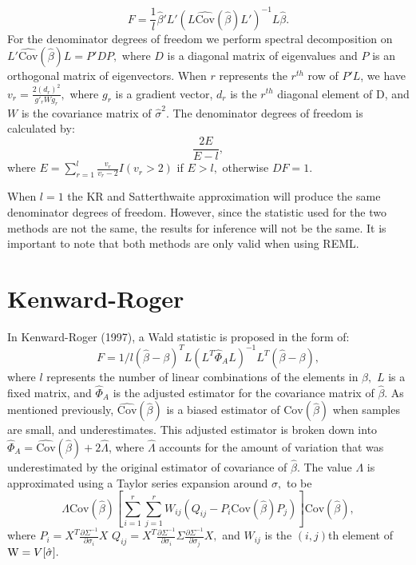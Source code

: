 \documentclass[12pt, twoside]{amherstthesis}
\begin{document}
\[F = \frac{1}{l}\hat\beta'L'(L\widehat {\text{Cov}}(\hat\beta) L')^{-1}L\hat\beta.\] For the denominator degrees of freedom we perform spectral decomposition on \(L'\widehat {\text{Cov}}(\hat\beta) L=P'DP,\) where \(D\) is a diagonal matrix of eigenvalues and \(P\) is an orthogonal matrix of eigenvectors. When \(r\) represents the \(r^{th}\) row of \(P'L\), we have \(v_r = \frac{2(d_r)^2}{g'_rWg_r},\) where \(g_r\) is a gradient vector, \(d_r\) is the \(r^{th}\) diagonal element of D, and \(W\) is the covariance matrix of \(\hat\sigma^2.\) The denominator degrees of freedom is calculated by:
\[\frac{2E}{E-l},\] where \(E = \sum_{r = 1}^{l} \frac{v_r}{v_r-2}I(v_r>2)\) if \(E >l,\) otherwise \(DF = 1.\)

When \(l =1\) the KR and Satterthwaite approximation will produce the same denominator degrees of freedom. However, since the statistic used for the two methods are not the same, the results for inference will not be the same. It is important to note that both methods are only valid when using REML.

\hypertarget{kenward-roger}{%
\section{Kenward-Roger}\label{kenward-roger}}

In Kenward-Roger (1997), a Wald statistic is proposed in the form of:
\[F = 1/l(\hat\beta-\beta)^TL(L^T\hat\Phi_A L)^{-1}L^T(\hat\beta-\beta),\] where \(l\) represents the number of linear combinations of the elements in \(\beta,\) \(L\) is a fixed matrix, and \(\hat\Phi_A\) is the adjusted estimator for the covariance matrix of \(\hat\beta\). As mentioned previously, \(\widehat {\text{Cov}}(\hat\beta)\) is a biased estimator of \(\text{Cov}(\hat\beta)\) when samples are small, and underestimates. This adjusted estimator is broken down into \(\hat\Phi_A = \widehat {\text {Cov}}(\hat\beta) + 2\hat\Lambda\), where \(\hat\Lambda\) accounts for the amount of variation that was underestimated by the original estimator of covariance of \(\hat\beta\). The value \(\Lambda\) is approximated using a Taylor series expansion around \(\sigma,\) to be \[\Lambda\text{Cov}(\hat\beta)[\sum_{i=1}^{r}\sum_{j=1}^{r}W_{ij}(Q_{ij}-P_i\text{Cov}(\hat\beta)P_j)]\text{Cov}(\hat\beta),\] where
\(P_i = X^T\frac{\partial\Sigma^{-1}}{\partial\sigma_i}X\)
\(Q_{ij} = X^T \frac{\partial\Sigma^{-1}}{\partial\sigma_i}\Sigma\frac{\partial\Sigma^{-1}}{\partial\sigma_j}X,\) and \(W_{ij}\) is the \((i,j)\)th element of \(\text W = V[\hat\sigma].\)
\end{document}
